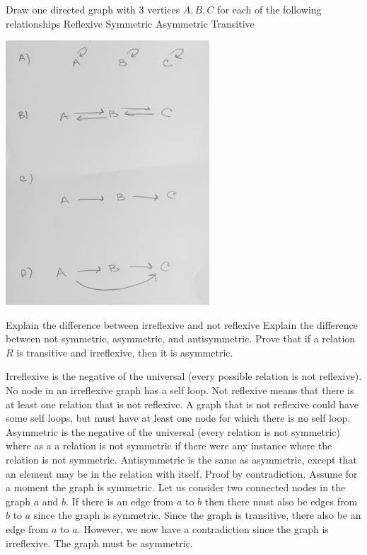 \documentclass[solution, letterpaper]{cs20inclass}
\begin{document}
\problem
Draw one directed graph with 3 vertices $A, B, C$ for each of the following relationships
\subproblem Reflexive
\subproblem Symmetric
\subproblem Asymmetric
\subproblem Transitive


\begin{solution}
\includegraphics[width=3in]{3NodeGraphs.jpg}



\end{solution}

\problem

\subproblem Explain the difference between irreflexive and not reflexive
\subproblem Explain the difference between not symmetric, asymmetric, and antisymmetric. 
\subproblem Prove that if a relation $R$ is transitive and irreflexive, then it is asymmetric.

\begin{solution}
\subproblem Irreflexive is the negative of the universal (every possible relation is not reflexive). No node in an irreflexive graph has a self loop. Not reflexive means that there is at least one relation that is not reflexive. A graph that is not reflexive could have some self loops, but must have at least one node for which there is no self loop. 
\subproblem Asymmetric is the negative of the universal (every relation is not symmetric) where as a a relation is not symmetric if there were any instance where the relation is not symmetric. Antisymmetric is the same as asymmetric, except that an element may be in the relation with itself.
\subproblem Proof by contradiction. Assume for a moment the graph is symmetric. Let us consider two connected nodes in the graph $a$ and  $b$. If there is an edge from $a$ to $b$  then there must also be edges from $b$ to $a$ since the graph is symmetric. Since the graph is transitive, there also be an edge from $a$ to $a$. However, we now have a contradiction since the graph is irreflexive. The graph must be asymmetric. 


\end{solution}
\end{document}

